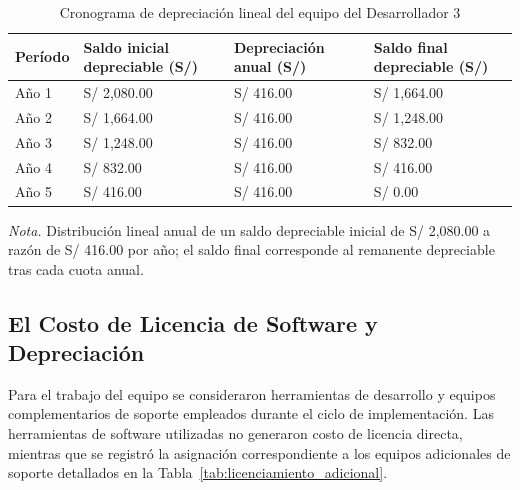 \begin{table}[htbp]
\centering
\caption{Cronograma de depreciación lineal del equipo del Desarrollador 3}
\label{tab:deprec_dev3_anios}
\begin{tabularx}{\textwidth}{@{}>{\raggedright\arraybackslash}p{2.2cm} >{\raggedleft\arraybackslash}X >{\raggedleft\arraybackslash}p{3.2cm} >{\raggedleft\arraybackslash}X@{}}
\toprule
\textbf{Período} & \textbf{Saldo inicial depreciable (S/)} & \textbf{Depreciación anual (S/)} & \textbf{Saldo final depreciable (S/)} \\
\midrule
Año 1 & S/ 2,080.00 & S/ 416.00 & S/ 1,664.00 \\
Año 2 & S/ 1,664.00 & S/ 416.00 & S/ 1,248.00 \\
Año 3 & S/ 1,248.00 & S/ 416.00 & S/ 832.00 \\
Año 4 & S/ 832.00 & S/ 416.00 & S/ 416.00 \\
Año 5 & S/ 416.00 & S/ 416.00 & S/ 0.00 \\
\bottomrule
\end{tabularx}
\par\vspace{0.3em}
\raggedright\footnotesize{\textit{Nota.} Distribución lineal anual de un saldo depreciable inicial de S/ 2,080.00 a razón de S/ 416.00 por año; el saldo final corresponde al remanente depreciable tras cada cuota anual.}
\end{table}

\FloatBarrier

\subsection{El Costo de Licencia de Software y Depreciación}

Para el trabajo del equipo se consideraron herramientas de desarrollo y equipos complementarios de soporte empleados durante el ciclo de implementación. Las herramientas de software utilizadas no generaron costo de licencia directa, mientras que se registró la asignación correspondiente a los equipos adicionales de soporte detallados en la Tabla~\ref{tab:licenciamiento_adicional}.

